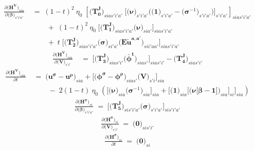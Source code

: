 \documentclass[11pt,fleqn]{article}
\newcommand{\bsigma}{\bm{\sigma}}
\newcommand{\bbeta}{\bm{\beta}}
\newcommand{\bV}{\bm{V}}
\newcommand{\bnu}{\bm{\nu}}
\newcommand{\bzero}{\bm{0}}
\newcommand{\bone}{\bm{1}}
\newcommand{\tu}{\tilde{u}}
\begin{document}
\begin{align*}
	\frac{ \partial \biggl( \bm{H^{V}} \biggr)_{sia} }{ \partial \biggl( \bbeta \biggr)_{s'i'a'} } & \;=\; 
		(1-t)^2 \: \eta_0 \; \left[ \biggl( \bm{T_0^J} \biggr)_{sias'i'a'} \; \Biggl[ \biggl( \bnu \biggr)_{s'i'a'} \Biggl( \biggl( \bone \biggr)_{s'i'a'} - \biggl( \bsigma^{-1} \biggr)_{s'i'a'} \Biggr) \Biggr]_{s'i'a'} \right]_{sias'i'a'} \\
		& \qquad \;+\;  (1-t)^2 \: \eta_0 \; \Biggl[ \biggl( \bm{T_1^J} \biggr)_{sias'i'a'} \biggl( \bnu \biggr)_{sia'} \Biggr]_{sias'i'a'} \\
		& \qquad \;+\; t \; \Biggl[ \biggl( \bm{T_2^J} \biggr)_{sias'i'a'} \biggl( \bsigma \biggr)_{si'a'} \biggl( \bm{{E\tu^{a,a'}}} \biggr)_{sii'aa'} \Biggr]_{sias'i'a'}
\end{align*}
\begin{align*}
	\frac{ \partial \biggl( \bm{H^{V}} \biggr)_{sia} }{ \partial \biggl( \bV \biggr)_{s'i'} } & \;=\; 
		\Biggl[ \biggl( \bm{T_3^J} \biggr)_{sias'i'} \biggl( \bm{{\bar{\phi}^t}} \biggr)_{sias'} \Biggr]_{sias'i'} - \biggl( \bm{T_4^J} \biggr)_{sias'i'}
\end{align*}
\begin{align*}
	\frac{ \partial \biggl( \bm{H^{V}} \biggr)_{sia} }{ \partial t } & \;=\; 
		\biggl( \bm{u^{\sigma}} - \bm{u^{\rho}} \biggr)_{sia} + \Biggl[ \biggl( \bm{\phi^{\sigma}} - \bm{\phi^{\rho}} \biggr)_{sias'} \biggl( \bV \biggr)_{s'i} \Biggr]_{sia} \\
		& \qquad \;-\; 2(1-t) \: \eta_0 \; \left( \Biggl[ \biggl( \bnu \biggr)_{sia} \biggl( \bsigma^{-1} \biggr)_{sia} \Biggr]_{sia} + \Biggl[ \biggl( \bone \biggr)_{sia} \Biggl[ \biggl( \bnu\bigl[\bbeta-\bone\bigr] \biggr)_{sia} \Biggr]_{si} \Biggr]_{sia} \right)
\end{align*}
\begin{align*}
	\frac{ \partial \biggl( \bm{H^{\sigma}} \biggr)_{si} }{ \partial \biggl( \bbeta \biggr)_{s'i'a'} } \;=\; 
	\Biggl[ \biggl( \bm{T_5^J} \biggr)_{sis'i'a'} \biggl( \bsigma \biggr)_{s'i'a'} \Biggr]_{sis'i'a'}
\end{align*}
\begin{align*}
	\frac{ \partial \biggl( \bm{H^{\sigma}} \biggr)_{si} }{ \partial \biggl( \bV \biggr)_{s'i'} } \;=\; \biggl( \bzero \biggr)_{sis'i'}
\end{align*}
\begin{align*}
	\frac{ \partial \biggl( \bm{H^{\sigma}} \biggr)_{si} }{ \partial t } \;=\; \biggl( \bzero \biggr)_{si}
\end{align*}
\end{document}
